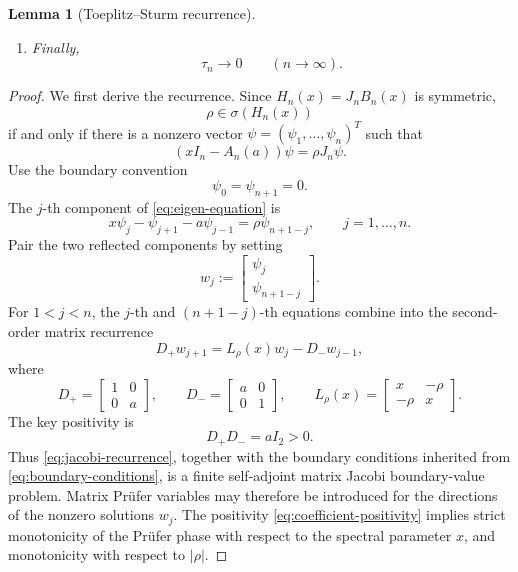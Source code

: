 \documentclass[11pt]{amsart}
\numberwithin{equation}{section}
\newtheorem{lemma}[theorem]{Lemma}
\begin{document}
\begin{lemma}[Toeplitz--Sturm recurrence]
\begin{enumerate}
\item Finally,
\begin{equation}\label{eq:tau-limit}
\tau_n\longrightarrow0
\qquad(n\to\infty).
\end{equation}
\end{enumerate}
\end{lemma}

\begin{proof}
We first derive the recurrence.  Since \(H_n(x)=J_nB_n(x)\) is symmetric,
\[
\rho\in\sigma(H_n(x))
\]
if and only if there is a nonzero vector \(\psi=(\psi_1,\dots,\psi_n)^T\) such that
\begin{equation}\label{eq:eigen-equation}
(xI_n-A_n(a))\psi=\rho J_n\psi.
\end{equation}
Use the boundary convention
\begin{equation}\label{eq:boundary-conditions}
\psi_0=\psi_{n+1}=0.
\end{equation}
The \(j\)-th component of \eqref{eq:eigen-equation} is
\begin{equation}\label{eq:component-equation}
x\psi_j-\psi_{j+1}-a \psi_{j-1}
=
\rho \psi_{n+1-j},
\qquad j=1,\dots,n.
\end{equation}
Pair the two reflected components by setting
\[
w_j:=
\begin{bmatrix}
\psi_j\\
\psi_{n+1-j}
\end{bmatrix}.
\]
For \(1<j<n\), the \(j\)-th and \((n+1-j)\)-th equations combine into the second-order matrix recurrence
\begin{equation}\label{eq:jacobi-recurrence}
D_+w_{j+1}
=
L_\rho(x)w_j-D_-w_{j-1},
\end{equation}
where
\begin{equation}\label{eq:jacobi-coefficients}
D_+
=
\begin{bmatrix}
1&0\\
0&a
\end{bmatrix},
\qquad
D_-
=
\begin{bmatrix}
a&0\\
0&1
\end{bmatrix},
\qquad
L_\rho(x)
=
\begin{bmatrix}
x&-\rho\\
-\rho&x
\end{bmatrix}.
\end{equation}
The key positivity is
\begin{equation}\label{eq:coefficient-positivity}
D_+D_-=aI_2>0.
\end{equation}
Thus \eqref{eq:jacobi-recurrence}, together with the boundary conditions inherited from \eqref{eq:boundary-conditions}, is a finite self-adjoint matrix Jacobi boundary-value problem.  Matrix Pr\"ufer variables may therefore be introduced for the directions of the nonzero solutions \(w_j\).  The positivity \eqref{eq:coefficient-positivity} implies strict monotonicity of the Pr\"ufer phase with respect to the spectral parameter \(x\), and monotonicity with respect to \(|\rho|\).


\end{proof}
\end{document}
